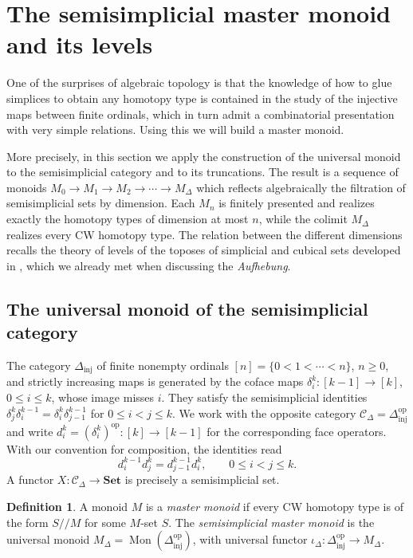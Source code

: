 \documentclass[11pt]{amsart}
\theoremstyle{definition}
\newtheorem{definition}[teo]{Definition}
\theoremstyle{remark}
\numberwithin{figure}{section}%
\newcommand{\CC}{\mathcal{C}}
\DeclareMathOperator{\Mon}{Mon}
\newcommand{\Set}{\mathbf{Set}}
\newcommand{\Dinj}{\Delta_{\mathrm{inj}}}
\newcommand{\op}{\mathrm{op}}
\begin{document}
\section{The semisimplicial master monoid and its levels}
\label{sec:semisimplicial-master-monoid}

One of the surprises of algebraic topology is that the knowledge of how to glue simplices to obtain any homotopy type is contained in the study of the injective maps between finite ordinals, which in turn admit a combinatorial presentation with very simple relations. Using this we will build a master monoid.

More precisely, in this section we apply the construction of the universal monoid to the semisimplicial category and to its truncations. The result is a sequence of monoids $M_0\to M_1\to M_2\to\cdots\to M_\Delta$ which reflects algebraically the filtration of semisimplicial sets by dimension. Each $M_n$ is finitely presented and realizes exactly the homotopy types of dimension at most $n$, while the colimit $M_\Delta$ realizes every CW homotopy type. The relation between the different dimensions recalls the theory of levels of the toposes of simplicial and cubical sets developed in \cite{KennettRiehlRoyZaks2011}, which we already met when discussing the \emph{Aufhebung}.

\subsection{The universal monoid of the semisimplicial category}
\label{subsec:semisimplicial-universal-monoid}

The category $\Dinj$ of finite nonempty ordinals $[n]=\{0<1<\cdots<n\}$, $n\geq0$, and strictly increasing maps is generated by the coface maps $\delta_i^k\colon[k-1]\to[k]$, $0\leq i\leq k$, whose image misses $i$. They satisfy the semisimplicial identities $\delta_j^k\delta_i^{k-1}=\delta_i^k\delta_{j-1}^{k-1}$ for $0\leq i<j\leq k$. We work with the opposite category $\CC_\Delta=\Dinj^{\op}$ and write $d_i^k=(\delta_i^k)^{\op}\colon[k]\to[k-1]$ for the corresponding face operators. With our convention for composition, the identities read
\[
d_i^{k-1}d_j^k=d_{j-1}^{k-1}d_i^k,\qquad 0\leq i<j\leq k.
\]
A functor $X\colon\CC_\Delta\to\Set$ is precisely a semisimplicial set.

\begin{definition}
A monoid $M$ is a \emph{master monoid} if every CW homotopy type is of the form $S/\!/M$ for some $M$-set $S$. The \emph{semisimplicial master monoid} is the universal monoid $M_\Delta=\Mon(\Dinj^{\op})$, with universal functor $\iota_\Delta\colon\Dinj^{\op}\to M_\Delta$.
\end{definition}
\end{document}
